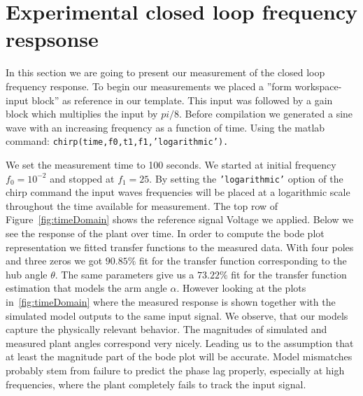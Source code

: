 \documentclass[ twoside,openright,titlepage,numbers=noenddot,headinclude,%
                footinclude=true,cleardoublepage=empty,abstractoff, %
                BCOR=5mm,paper=a4,fontsize=11pt,%
                ngerman,american,%
                ]{scrreprt}
\begin{document}
{\section{Experimental closed loop frequency respsonse}
In this section we are going to present our measurement of the closed loop frequency response. To begin our measurements we placed a ''form workspace-input block'' as reference in our template.  This input was followed by a gain block which multiplies the input by $pi/8$. Before compilation we generated a sine wave with an increasing frequency as a function of time. Using the matlab command: \texttt{chirp(time,f0,t1,f1}\texttt{,'logarithmic').}} We set the measurement time to 100 seconds. We started at initial frequency $f_0 = 10^{-2}$ and stopped at $f_1 = 25$. By setting the \texttt{'logarithmic'} option of the chirp command the input waves frequencies will be placed at a logarithmic scale throughout the time available for measurement. The top row of Figure~\ref{fig:timeDomain} shows the reference signal Voltage we applied. Below we see the response of the plant over time. In order to compute the bode plot representation we fitted transfer functions to the measured data. With four poles and three zeros we got $90.85\%$ fit for the transfer function corresponding to the hub angle $\theta$. The same parameters give us a $73.22\%$ fit for the transfer function estimation that models the arm angle $\alpha$. However looking at the plots in~\ref{fig:timeDomain} where the measured response is shown together with the simulated model outputs to the same input signal. We observe, that our models capture the physically relevant behavior. The magnitudes of simulated and measured plant angles correspond very nicely. Leading us to the assumption that at least the magnitude part of the bode plot will be accurate. Model mismatches probably stem from failure to predict the phase lag properly, especially at high frequencies, where the plant completely fails to track the input signal.
 
\end{document}
